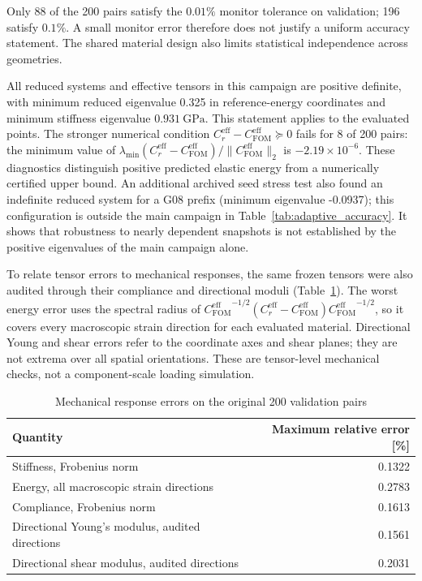 \documentclass[pdflatex,sn-basic,Numbered]{sn-jnl}
\newcommand{\Cr}{C^{\mathrm{eff}}_r}
\newcommand{\Cfom}{C^{\mathrm{eff}}_{\mathrm{FOM}}}
\begin{document}
Only 88 of the 200 pairs satisfy the \(0.01\%\) monitor tolerance on
validation; 196 satisfy \(0.1\%\). A small monitor error therefore does not
justify a uniform accuracy statement. The shared material design also limits
statistical independence across geometries.

All reduced systems and effective tensors in this campaign are positive
definite, with minimum reduced eigenvalue 0.325 in reference-energy
coordinates and minimum stiffness eigenvalue
\(0.931~\si{\giga\pascal}\). This statement applies to the evaluated points.
The stronger numerical condition \(\Cr-\Cfom\succeq0\) fails for 8 of
200 pairs: the minimum value of
\(\lambda_{\min}(\Cr-\Cfom)/\|\Cfom\|_2\) is
\(-2.19\times10^{-6}\). These diagnostics distinguish positive predicted
elastic energy from a numerically certified upper bound.
An additional archived seed stress test also found an indefinite reduced
system for a G08 prefix (minimum eigenvalue -0.0937); this configuration is
outside the main campaign in Table~\ref{tab:adaptive_accuracy}. It shows
that robustness to nearly dependent snapshots is not established by the
positive eigenvalues of the main campaign alone.


To relate tensor errors to mechanical responses, the same frozen tensors
were also audited through their compliance and directional moduli
(Table~\ref{tab:mechanical_errors}). The worst energy error uses the spectral
radius of \({\Cfom}^{-1/2}(\Cr-\Cfom){\Cfom}^{-1/2}\), so it covers every
macroscopic strain direction for each evaluated material. Directional Young
and shear errors refer to the coordinate axes and shear planes; they are not extrema over
all spatial orientations. These are tensor-level mechanical checks, not a
component-scale loading simulation.

\begin{table}[t]
\centering
\caption{Mechanical response errors on the original 200 validation pairs}
\label{tab:mechanical_errors}
\begin{tabular}{@{}lr@{}}
\toprule
Quantity & Maximum relative error [\%] \\
\midrule
Stiffness, Frobenius norm & 0.1322 \\
Energy, all macroscopic strain directions & 0.2783 \\
Compliance, Frobenius norm & 0.1613 \\
Directional Young's modulus, audited directions & 0.1561 \\
Directional shear modulus, audited directions & 0.2031 \\
\bottomrule
\end{tabular}
\end{table}
\end{document}
